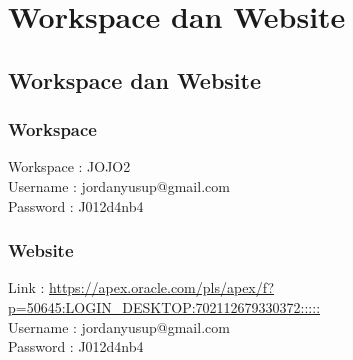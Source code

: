 \chapter{Workspace dan Website}

\section{Workspace dan Website}

\subsection{Workspace}
Workspace	: JOJO2\\
Username	: jordanyusup@gmail.com\\
Password	: J012d4nb4

\subsection{Website}
Link 		: \url{https://apex.oracle.com/pls/apex/f?p=50645:LOGIN_DESKTOP:702112679330372:::::}\\
Username	: jordanyusup@gmail.com\\
Password	: J012d4nb4
